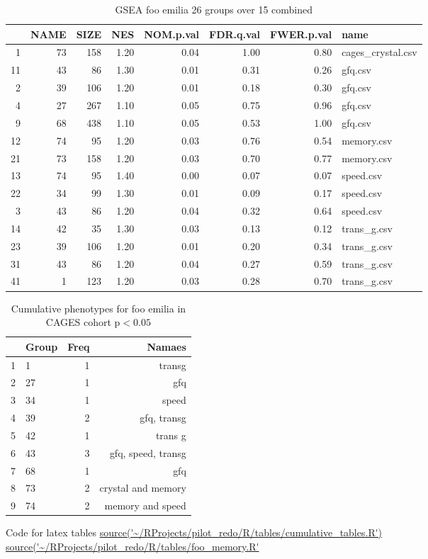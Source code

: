 \begin{table}[ht]
\centering
\begin{tabular}{rrrrrrrl}
  \hline
 & NAME & SIZE & NES & NOM.p.val & FDR.q.val & FWER.p.val & name \\ 
  \hline
1 &  73 & 158 & 1.20 & 0.04 & 1.00 & 0.80 & cages\_crystal.csv \\ 
  11 &  43 &  86 & 1.30 & 0.01 & 0.31 & 0.26 & gfq.csv \\ 
  2 &  39 & 106 & 1.20 & 0.01 & 0.18 & 0.30 & gfq.csv \\ 
  4 &  27 & 267 & 1.10 & 0.05 & 0.75 & 0.96 & gfq.csv \\ 
  9 &  68 & 438 & 1.10 & 0.05 & 0.53 & 1.00 & gfq.csv \\ 
  12 &  74 &  95 & 1.20 & 0.03 & 0.76 & 0.54 & memory.csv \\ 
  21 &  73 & 158 & 1.20 & 0.03 & 0.70 & 0.77 & memory.csv \\ 
  13 &  74 &  95 & 1.40 & 0.00 & 0.07 & 0.07 & speed.csv \\ 
  22 &  34 &  99 & 1.30 & 0.01 & 0.09 & 0.17 & speed.csv \\ 
  3 &  43 &  86 & 1.20 & 0.04 & 0.32 & 0.64 & speed.csv \\ 
  14 &  42 &  35 & 1.30 & 0.03 & 0.13 & 0.12 & trans\_g.csv \\ 
  23 &  39 & 106 & 1.20 & 0.01 & 0.20 & 0.34 & trans\_g.csv \\ 
  31 &  43 &  86 & 1.20 & 0.04 & 0.27 & 0.59 & trans\_g.csv \\ 
  41 &   1 & 123 & 1.20 & 0.03 & 0.28 & 0.70 & trans\_g.csv \\ 
   \hline
\end{tabular}
\caption{GSEA foo emilia 26 groups over 15 combined} 
\label{combined_foo}
\end{table}

\begin{table}[ht]
\centering
\begin{tabular}{rlrr}
  \hline
 & Group & Freq & Namaes \\ 
  \hline
1 & 1 &   1 & transg\\ 
  2 & 27 &   1 & gfq \\ 
  3 & 34 &   1 & speed  \\ 
  4 & 39 &   2 & gfq, transg\\
  5 & 42 &   1 & trans g \\ 
  6 & 43 &   3 & gfq, speed, transg\\ 
  7 & 68 &   1 & gfq\\ 
  8 & 73 &   2 & crystal and memory \\ 
  9 & 74 &   2 & memory and speed \\ 
   \hline
\end{tabular}
\caption{Cumulative phenotypes for foo emilia in CAGES cohort p$< 0.05$}
\label{combined_foo_phenotypes}
\end{table}
Code for latex tables \url{source('~/RProjects/pilot_redo/R/tables/cumulative_tables.R')}
\url{source('~/RProjects/pilot_redo/R/tables/foo_memory.R'}


